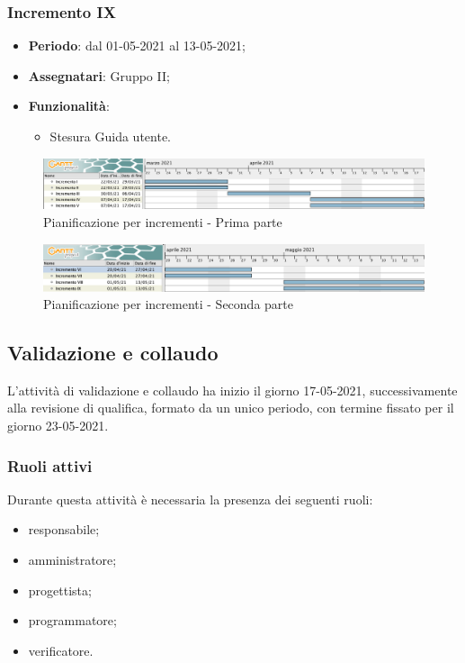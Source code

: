\subsubsection{Incremento IX}
\begin{itemize}
	\item \textbf{Periodo}: dal 01-05-2021 al 13-05-2021;
	\item \textbf{Assegnatari}: Gruppo II;
	\item \textbf{Funzionalità}:
	\begin{itemize}
		\item Stesura Guida utente.
	\end{itemize}
\end{itemize}

\newpage

\begin{landscape}
	\begin{figure}[h!]
		\includegraphics[width=24cm]{images/4_Incrementi_1.png}
		\caption{Pianificazione per incrementi - Prima parte}
	\end{figure}

    \begin{figure}[h!]
        \includegraphics[width=24cm]{images/4_Incrementi_2.png}
        \caption{Pianificazione per incrementi - Seconda parte}
    \end{figure}
\end{landscape}

\newpage

\subsection{Validazione e collaudo}
L'attività di validazione e collaudo ha inizio il giorno 17-05-2021, successivamente alla revisione di qualifica, formato da un unico periodo, con termine fissato per il giorno 23-05-2021.

\subsubsection{Ruoli attivi}
Durante questa attività è necessaria la presenza dei seguenti ruoli:
\begin{itemize}
	\item responsabile;
	\item amministratore;
	\item progettista;
	\item programmatore;
	\item verificatore.
\end{itemize}
